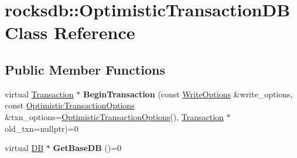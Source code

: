 \hypertarget{classrocksdb_1_1OptimisticTransactionDB}{}\section{rocksdb\+:\+:Optimistic\+Transaction\+DB Class Reference}
\label{classrocksdb_1_1OptimisticTransactionDB}
\subsection*{Public Member Functions}
\begin{DoxyCompactItemize}
\item 
virtual \hyperlink{classrocksdb_1_1Transaction}{Transaction} $\ast$ {\bfseries Begin\+Transaction} (const \hyperlink{structrocksdb_1_1WriteOptions}{Write\+Options} \&write\+\_\+options, const \hyperlink{structrocksdb_1_1OptimisticTransactionOptions}{Optimistic\+Transaction\+Options} \&txn\+\_\+options=\hyperlink{structrocksdb_1_1OptimisticTransactionOptions}{Optimistic\+Transaction\+Options}(), \hyperlink{classrocksdb_1_1Transaction}{Transaction} $\ast$old\+\_\+txn=nullptr)=0\hypertarget{classrocksdb_1_1OptimisticTransactionDB_a2c6efa583e4fb58ae5b37d71f59a81da}{}\label{classrocksdb_1_1OptimisticTransactionDB_a2c6efa583e4fb58ae5b37d71f59a81da}

\item 
virtual \hyperlink{classrocksdb_1_1DB}{DB} $\ast$ {\bfseries Get\+Base\+DB} ()=0\hypertarget{classrocksdb_1_1OptimisticTransactionDB_a3884f36d6bb661670fb57e97c10e3e1f}{}\label{classrocksdb_1_1OptimisticTransactionDB_a3884f36d6bb661670fb57e97c10e3e1f}

\end{DoxyCompactItemize}
